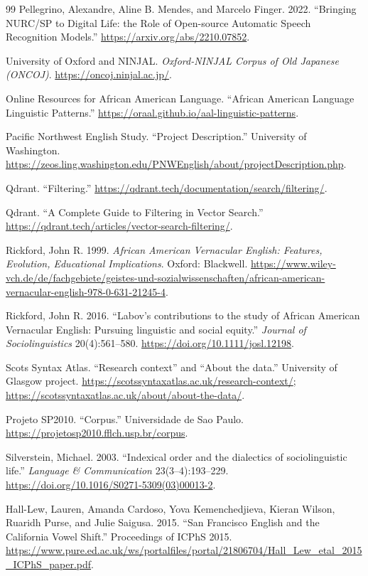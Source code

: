 \documentclass[11pt]{article}
\begin{document}
\begin{thebibliography}{99}
Pellegrino, Alexandre, Aline B. Mendes, and Marcelo Finger. 2022.
``Bringing NURC/SP to Digital Life: the Role of Open-source Automatic Speech
Recognition Models.''
\url{https://arxiv.org/abs/2210.07852}.

University of Oxford and NINJAL.
\emph{Oxford-NINJAL Corpus of Old Japanese (ONCOJ)}.
\url{https://oncoj.ninjal.ac.jp/}.

Online Resources for African American Language.
``African American Language Linguistic Patterns.''
\url{https://oraal.github.io/aal-linguistic-patterns}.

Pacific Northwest English Study.
``Project Description.''
University of Washington.
\url{https://zeos.ling.washington.edu/PNWEnglish/about/projectDescription.php}.

Qdrant.
``Filtering.''
\url{https://qdrant.tech/documentation/search/filtering/}.

Qdrant.
``A Complete Guide to Filtering in Vector Search.''
\url{https://qdrant.tech/articles/vector-search-filtering/}.

Rickford, John R. 1999.
\emph{African American Vernacular English: Features, Evolution, Educational
Implications}.
Oxford: Blackwell.
\url{https://www.wiley-vch.de/de/fachgebiete/geistes-und-sozialwissenschaften/african-american-vernacular-english-978-0-631-21245-4}.

Rickford, John R. 2016.
``Labov's contributions to the study of African American Vernacular English:
Pursuing linguistic and social equity.''
\emph{Journal of Sociolinguistics} 20(4):561--580.
\url{https://doi.org/10.1111/josl.12198}.

Scots Syntax Atlas.
``Research context'' and ``About the data.''
University of Glasgow project.
\url{https://scotssyntaxatlas.ac.uk/research-context/};
\url{https://scotssyntaxatlas.ac.uk/about/about-the-data/}.

Projeto SP2010.
``Corpus.''
Universidade de Sao Paulo.
\url{https://projetosp2010.fflch.usp.br/corpus}.

Silverstein, Michael. 2003.
``Indexical order and the dialectics of sociolinguistic life.''
\emph{Language \& Communication} 23(3--4):193--229.
\url{https://doi.org/10.1016/S0271-5309(03)00013-2}.

Hall-Lew, Lauren, Amanda Cardoso, Yova Kemenchedjieva, Kieran Wilson, Ruaridh
Purse, and Julie Saigusa. 2015.
``San Francisco English and the California Vowel Shift.''
Proceedings of ICPhS 2015.
\url{https://www.pure.ed.ac.uk/ws/portalfiles/portal/21806704/Hall_Lew_etal_2015_ICPhS_paper.pdf}.


\end{thebibliography}
\end{document}
